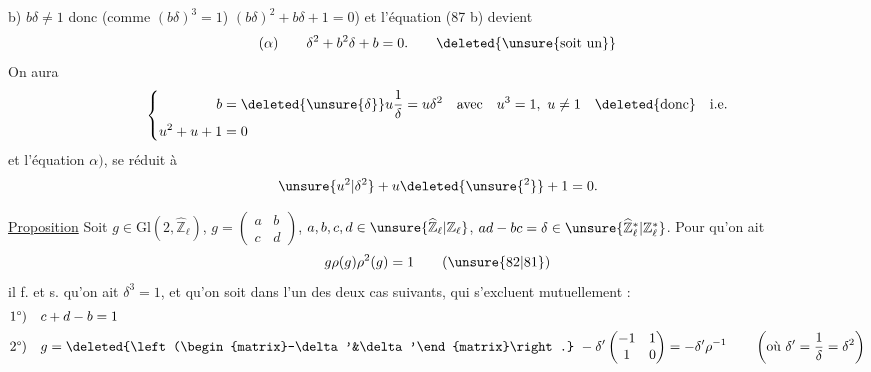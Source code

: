 b) $b\delta\ne1$ donc (comme $(b\delta)^3=1$) $(b\delta)^2+b\delta+1=0$)
et l'équation (87 b) devient
\[
(\alpha)\qquad\delta^2+b^2\delta+b=0.\qquad\deleted{\text{\unsure{soit un}}}
\]
On aura
\[
\left\{\begin{aligned}
b&=\deleted{\unsure{\delta}}u\frac1\delta=u\delta^2\quad\text{avec}\quad u^3=1,\ u\ne1\quad\deleted{\text{donc}}\quad\text{i.e.}\\
u^2+u+1&=0
\end{aligned}\right.
\]
et l'équation $\alpha)$,  se réduit à
\[
\unsure{u^2|\delta^2}+u\deleted{\unsure{{}^{2}}}+1=0.
\]



\uline{Proposition} Soit $g\in\mathrm{Gl}(2,\widehat{\mathbb Z}_\ell)$, $g=\begin{pmatrix}a&b\\c&d\end{pmatrix}$, $a,b,c,d\in\unsure{\widehat{\mathbb Z}_\ell|\mathbb Z_\ell}$,
$ad-bc=\delta\in\unsure{\widehat{\mathbb Z}_\ell^{*}|\mathbb Z_\ell^{*}}$. Pour qu'on ait
\[
g\rho(g)\rho^2(g)=1\qquad(\unsure{82|81})
\]
il f. et s. qu'on ait $\delta^3=1$, et qu'on soit dans l'un des deux cas suivants, qui s'excluent mutuellement :
\[
\begin{aligned}
1\text{°)}\quad&c+d-b=1\\
2\text{°)}\quad&g=\deleted{\left(\begin{matrix}-\delta'&\delta'\end{matrix}\right.}\ -\delta'\begin{pmatrix}-1&1\\1&0\end{pmatrix}=-\delta'\rho^{-1}\qquad\left(\text{où }\delta'=\frac1\delta=\delta^2\right)
\end{aligned}
\]

